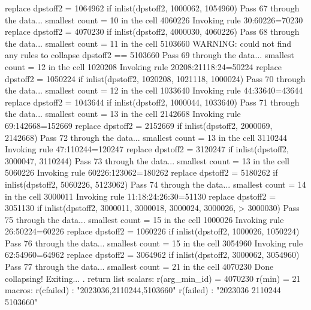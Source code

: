   replace dpstoff2 = 1064962 if inlist(dpstoff2, 1000062, 1054960)
Pass 67 through the data...
  smallest count = 10 in the cell      4060226
  Invoking rule 30:60226=70230
  replace dpstoff2 = 4070230 if inlist(dpstoff2, 4000030, 4060226)
Pass 68 through the data...
  smallest count = 11 in the cell      5103660
  WARNING: could not find any rules to collapse dpstoff2 == 5103660
Pass 69 through the data...
  smallest count = 12 in the cell      1020208
  Invoking rule 20208:21118:24=50224
  replace dpstoff2 = 1050224 if inlist(dpstoff2, 1020208, 1021118, 1000024)
Pass 70 through the data...
  smallest count = 12 in the cell      1033640
  Invoking rule 44:33640=43644
  replace dpstoff2 = 1043644 if inlist(dpstoff2, 1000044, 1033640)
Pass 71 through the data...
  smallest count = 13 in the cell      2142668
  Invoking rule 69:142668=152669
  replace dpstoff2 = 2152669 if inlist(dpstoff2, 2000069, 2142668)
Pass 72 through the data...
  smallest count = 13 in the cell      3110244
  Invoking rule 47:110244=120247
  replace dpstoff2 = 3120247 if inlist(dpstoff2, 3000047, 3110244)
Pass 73 through the data...
  smallest count = 13 in the cell      5060226
  Invoking rule 60226:123062=180262
  replace dpstoff2 = 5180262 if inlist(dpstoff2, 5060226, 5123062)
Pass 74 through the data...
  smallest count = 14 in the cell      3000011
  Invoking rule 11:18:24:26:30=51130
  replace dpstoff2 = 3051130 if inlist(dpstoff2, 3000011, 3000018, 3000024, 3000026,
>  3000030)
Pass 75 through the data...
  smallest count = 15 in the cell      1000026
  Invoking rule 26:50224=60226
  replace dpstoff2 = 1060226 if inlist(dpstoff2, 1000026, 1050224)
Pass 76 through the data...
  smallest count = 15 in the cell      3054960
  Invoking rule 62:54960=64962
  replace dpstoff2 = 3064962 if inlist(dpstoff2, 3000062, 3054960)
Pass 77 through the data...
  smallest count = 21 in the cell      4070230
  Done collapsing! Exiting...
{\smallskip}
. return list
{\smallskip}
scalars:
         r(arg_min_id) =  4070230
                r(min) =  21
{\smallskip}
macros:
            r(cfailed) : "2023036,2110244,5103660"
             r(failed) : "2023036 2110244 5103660"
